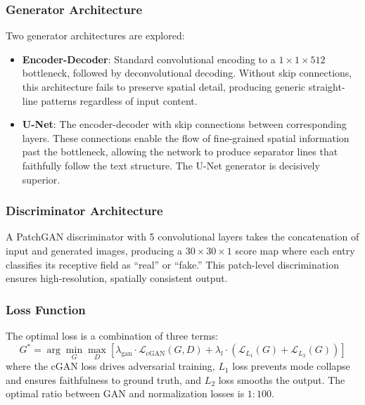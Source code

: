 \documentclass[11pt, a4paper]{article}
\begin{document}
\subsubsection{Generator Architecture}

Two generator architectures are explored:

\begin{itemize}[leftmargin=1.5em]
    \item \textbf{Encoder-Decoder}: Standard convolutional encoding to a $1\times1\times512$ bottleneck, followed by deconvolutional decoding. Without skip connections, this architecture fails to preserve spatial detail, producing generic straight-line patterns regardless of input content.
    
    \item \textbf{U-Net}: The encoder-decoder with skip connections between corresponding layers. These connections enable the flow of fine-grained spatial information past the bottleneck, allowing the network to produce separator lines that faithfully follow the text structure. The U-Net generator is decisively superior.
\end{itemize}

\subsubsection{Discriminator Architecture}

A PatchGAN discriminator with 5 convolutional layers takes the concatenation of input and generated images, producing a $30\times30\times1$ score map where each entry classifies its receptive field as ``real'' or ``fake.'' This patch-level discrimination ensures high-resolution, spatially consistent output.

\subsubsection{Loss Function}

The optimal loss is a combination of three terms:
\begin{equation}
    G^* = \arg\min_G \max_D \left[\lambda_{\text{gan}} \cdot \mathcal{L}_{\text{cGAN}}(G,D) + \lambda_l \cdot \left(\mathcal{L}_{L_1}(G) + \mathcal{L}_{L_2}(G)\right)\right]
\end{equation}
where the cGAN loss drives adversarial training, $L_1$ loss prevents mode collapse and ensures faithfulness to ground truth, and $L_2$ loss smooths the output. The optimal ratio between GAN and normalization losses is $1:100$.
\end{document}
